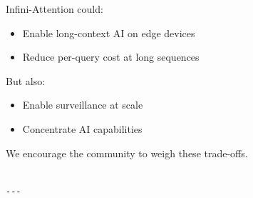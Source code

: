 Infini-Attention could:

\begin{itemize}
\item Enable long-context AI on edge devices
\item Reduce per-query cost at long sequences

\end{itemize}
But also:

\begin{itemize}
\item Enable surveillance at scale
\item Concentrate AI capabilities

\end{itemize}
We encourage the community to weigh these trade-offs.
\begin{lstlisting}

---
\end{lstlisting}

